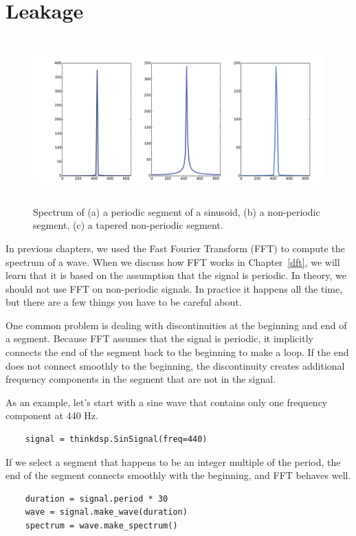 \documentclass[12pt]{book}
\begin{document}
\section{Leakage}

\begin{figure}
\centerline{\includegraphics[height=2.5in]{figs/windowing1.pdf}}
\caption{Spectrum of (a) a periodic segment of a sinusoid, (b)
a non-periodic segment, (c) a tapered non-periodic segment.}
\label{fig.windowing1}
\end{figure}

In previous chapters, we used the Fast Fourier Transform (FFT) to
compute the spectrum of a wave.  When we discuss how FFT works in
Chapter~\ref{dft}, we will learn that it is based on the assumption
that the signal is periodic.  In theory, we should not use FFT on
non-periodic signals.  In practice it happens all the time, but there
are a few things you have to be careful about.

One common problem is dealing with discontinuities at the beginning
and end of a segment.  Because FFT assumes that the signal is periodic,
it implicitly connects the end of the segment back to the beginning
to make a loop.  If the end does not connect smoothly to the beginning,
the discontinuity creates additional frequency components in the
segment that are not in the signal.

As an example, let's start with a sine wave that contains only
one frequency component at 440 Hz.

\begin{verbatim}
    signal = thinkdsp.SinSignal(freq=440)
\end{verbatim}

If we select a segment that happens to be an integer multiple of
the period, the end of the segment connects smoothly with the
beginning, and FFT behaves well.

\begin{verbatim}
    duration = signal.period * 30
    wave = signal.make_wave(duration)
    spectrum = wave.make_spectrum()
\end{verbatim}
\end{document}
